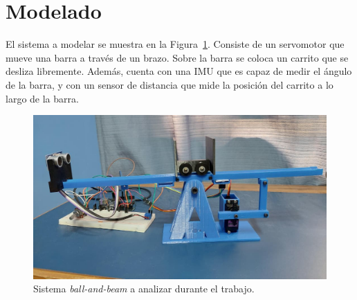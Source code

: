 \section{Modelado}

El sistema a modelar se muestra en la Figura~\ref{fig:planta}. Consiste de un servomotor que mueve una barra a través de un brazo. Sobre la barra se coloca un carrito que se desliza libremente. Además, cuenta con una IMU que es capaz de medir el ángulo de la barra, y con un sensor de distancia que mide la posición del carrito a lo largo de la barra.

\begin{figure}[!tbp]
    \centering
    \includegraphics[width=\linewidth]{img/planta.jpg}
    \caption{Sistema \emph{ball-and-beam} a analizar durante el trabajo.}
    \label{fig:planta}
\end{figure}

